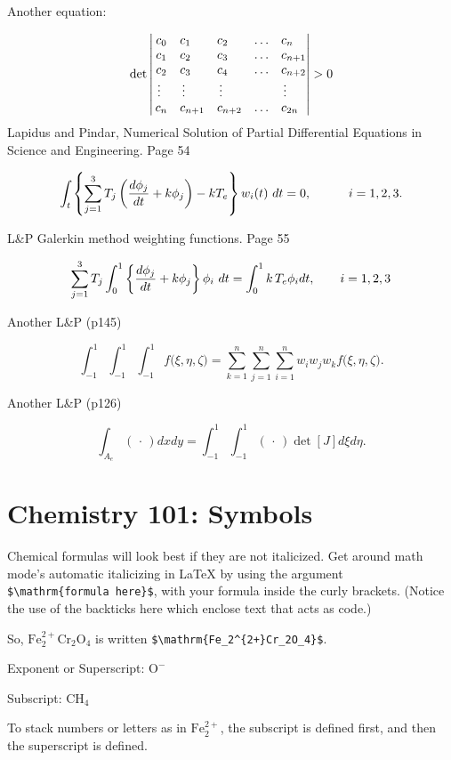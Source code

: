 \documentclass[12pt,twoside]{reedthesis}
\begin{document}
Another equation:

\[\det\left|\,\begin{matrix}%
c_0&c_1\hfill&c_2\hfill&\ldots&c_n\hfill\cr
c_1&c_2\hfill&c_3\hfill&\ldots&c_{n+1}\hfill\cr
c_2&c_3\hfill&c_4\hfill&\ldots&c_{n+2}\hfill\cr
\,\vdots\hfill&\,\vdots\hfill&
  \,\vdots\hfill&&\,\vdots\hfill\cr
c_n&c_{n+1}\hfill&c_{n+2}\hfill&\ldots&c_{2n}\hfill\cr
\end{matrix}\right|>0\]
Lapidus and Pindar, Numerical Solution of Partial Differential Equations in Science and
Engineering. Page 54

\[
\int_t\left\{\sum_{j=1}^3 T_j \left({d\phi_j\over dt}+k\phi_j\right)-kT_e\right\}w_i(t)\ dt=0,
   \qquad\quad i=1,2,3.
\]

L\&P Galerkin method weighting functions. Page 55

\[
\sum_{j=1}^3 T_j\int_0^1\left\{{d\phi_j\over dt} + k\phi_j\right\} \phi_i\ dt
   = \int_{0}^1k\,T_e\phi_idt, \qquad i=1,2,3 \]

Another L\&P (p145)

\[
\int_{-1}^1\!\int_{-1}^1\!\int_{-1}^1 f\big(\xi,\eta,\zeta\big)
   = \sum_{k=1}^n\sum_{j=1}^n\sum_{i=1}^n w_i w_j w_k f\big( \xi,\eta,\zeta\big).
\]

Another L\&P (p126)

\[
\int_{A_e} (\,\cdot\,) dx dy = \int_{-1}^1\!\int_{-1}^1 (\,\cdot\,) \det[J] d\xi d\eta.
\]

\hypertarget{chemistry-101-symbols}{%
\section{Chemistry 101: Symbols}\label{chemistry-101-symbols}}

Chemical formulas will look best if they are not italicized. Get around math mode's automatic italicizing in LaTeX by using the argument \texttt{\$\textbackslash{}mathrm\{formula\ here\}\$}, with your formula inside the curly brackets. (Notice the use of the backticks here which enclose text that acts as code.)

So, \(\mathrm{Fe_2^{2+}Cr_2O_4}\) is written \texttt{\$\textbackslash{}mathrm\{Fe\_2\^{}\{2+\}Cr\_2O\_4\}\$}.

\noindent Exponent or Superscript: \(\mathrm{O^-}\)

\noindent Subscript: \(\mathrm{CH_4}\)

To stack numbers or letters as in \(\mathrm{Fe_2^{2+}}\), the subscript is defined first, and then the superscript is defined.
\end{document}
